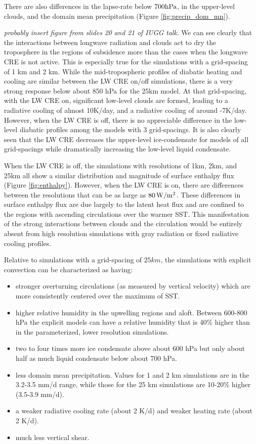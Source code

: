 \documentclass[11pt]{article}   	%
\begin{document}
There are also differences in the lapse-rate below $700 \rm{hPa}$, in the upper-level clouds,
and the domain mean precipitation (Figure \ref{fig:precip_dom_mn}).
  
\textit{probably insert figure from slides 20 and 21 of IUGG talk.}
We can see clearly that the interactions between longwave radiation and clouds act to dry the troposphere in the regions of subsidence 
more than the cases when the longwave CRE is not active.  This is especially true for the simulations with a grid-spacing of 1 km 
and 2 km.  While the mid-tropospheric profiles of diabatic heating and cooling are similar between the LW CRE on/off simulations, 
there is a very strong response below about 850 hPa for the 25km model.  At that grid-spacing, with the LW CRE on, significant 
low-level clouds are formed, leading to a radiative cooling of almost 10K/day, and a radiative cooling of around -7K/day.   However, 
when the LW CRE is off, there is no appreciable difference in the low-level diabatic profiles among the models with 3 grid-spacings.   It 
is also clearly seen that the LW CRE decreases the upper-level ice-condensate for models of all grid-spacings while dramatically 
increasing the low-level liquid condensate.  

When the LW CRE is off, the simulations with resolutions of 1km, 2km, and 25km all show a similar distribution and magnitude of surface 
enthalpy flux (Figure \ref{fig:enthalpy}).  However, when the LW CRE is on, there are differences between the resolutions that can be as 
large as $80 \, \rm{W/m^2}$.   These differences in surface enthalpy flux are due largely to the latent heat flux and are confined to the 
regions with ascending circulations over the warmer SST.  This manifestation of the strong interactions between clouds and the circulation 
would be entirely absent from high resolution simulations with gray radiation or fixed radiative cooling profiles.  


Relative to simulations with a grid-spacing of $25 \textit{km}$, the simulations with explicit convection can be characterized as having: 
\begin{itemize}
  \item stronger overturning circulations (as measured by vertical velocity) which are more consistently centered over the maximum of SST.  
  \item higher relative humidity in the upwelling regions and aloft.   Between 600-800 hPa the explicit models can have a relative humidity 
  that is 40\% higher than in the parameterized, lower resolution simulations.  
  \item two to four times more ice condensate above about 600 hPa but only about half as much liquid condensate below about 700 hPa.
  \item less domain mean precipitation.  Values for 1 and 2 km simulations are in the 3.2-3.5 mm/d range, while those for the 25 km 
  simulations are 10-20\% higher (3.5-3.9 mm/d).  
  \item a weaker radiative cooling rate (about 2 K/d) and weaker heating rate (about 2 K/d).
  \item much less vertical shear.  
\end{itemize}
\end{document}
